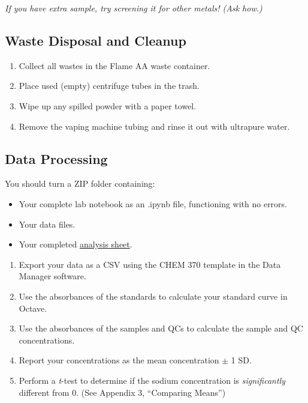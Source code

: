 \documentclass[]{tufte-book}
\providecommand{\tightlist}{%
  \setlength{\itemsep}{0pt}\setlength{\parskip}{0pt}}
\begin{document}
\emph{If you have extra sample, try screening it for other metals! (Ask how.)}

\hypertarget{waste-disposal-and-cleanup-6}{%
\subsection{Waste Disposal and Cleanup}\label{waste-disposal-and-cleanup-6}}

\begin{enumerate}
\def\labelenumi{\arabic{enumi}.}
\tightlist
\item
  Collect all wastes in the Flame AA waste container.
\item
  Place used (empty) centrifuge tubes in the trash.
\item
  Wipe up any spilled powder with a paper towel.
\item
  Remove the vaping machine tubing and rinse it out with ultrapure water.
\end{enumerate}

\hypertarget{data-processing-8}{%
\subsection{Data Processing}\label{data-processing-8}}

\begin{marginfigure}
You should turn a ZIP folder containing:

\begin{itemize}
\tightlist
\item
  Your complete lab notebook as an .ipynb file, functioning with no
  errors.\\
\item
  Your data files.\\
\item
  Your completed
  \href{https://github.com/alphonse/alphonse.github.io/raw/master/devel/chem370/assignments/excel-templates/rotation_faas_data-analysis.xlsx}{analysis
  sheet}.
\end{itemize}
\end{marginfigure}

\begin{enumerate}
\def\labelenumi{\arabic{enumi}.}
\tightlist
\item
  Export your data as a CSV using the CHEM 370 template in the Data Manager software.
\item
  Use the absorbances of the standards to calculate your standard curve in Octave.
\item
  Use the absorbances of the samples and QCs to calculate the sample and QC concentrations.
\item
  Report your concentrations as the mean concentration \(\pm\) 1 SD.
\item
  Perform a \emph{t}-test to determine if the sodium concentration is \emph{significantly} different from 0. (See Appendix 3, ``Comparing Means'')
\end{enumerate}
\end{document}

